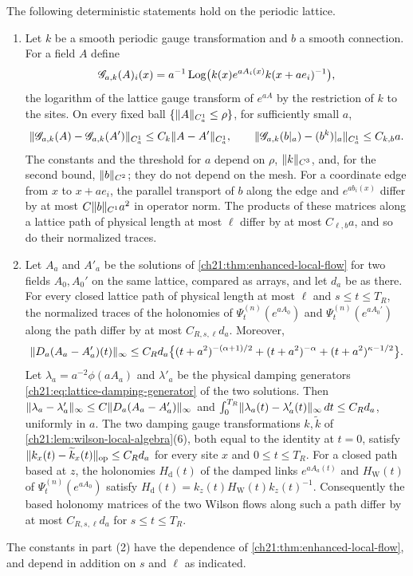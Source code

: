 \begin{lemma}\label{ch21:lem:local-matrix-gauge-and-loops}
The following deterministic statements hold on the periodic lattice.
\begin{enumerate}
\item Let $k$ be a smooth periodic gauge transformation and $b$ a smooth connection. For a field $A$ define
\[
 \mathscr G_{a,k}(A)_i(x)=a^{-1}\operatorname{Log}\bigl(k(x)e^{aA_i(x)}k(x+ae_i)^{-1}\bigr),
\]
the logarithm of the lattice gauge transform of $e^{aA}$ by the restriction of $k$ to the sites. On every fixed ball $\{\lVert A\rVert_{C_a^1}\le\rho\}$, for sufficiently small $a$,
\[
 \lVert \mathscr G_{a,k}(A)-\mathscr G_{a,k}(A')\rVert_{C_a^1}\le C_k\lVert A-A'\rVert_{C_a^1},\qquad
 \lVert \mathscr G_{a,k}(b|_a)-(b^k)|_a\rVert_{C_a^1}\le C_{k,b}a .
\]
The constants and the threshold for $a$ depend on $\rho$, $\lVert k\rVert_{C^3}$, and, for the second bound, $\lVert b\rVert_{C^2}$; they do not depend on the mesh. For a coordinate edge from $x$ to $x+ae_i$, the parallel transport of $b$ along the edge and $e^{ab_i(x)}$ differ by at most $C\lVert b\rVert_{C^1}a^2$ in operator norm. The products of these matrices along a lattice path of physical length at most $\ell$ differ by at most $C_{\ell,b}a$, and so do their normalized traces.
\item Let $A_a$ and $A'_a$ be the solutions of \cref{ch21:thm:enhanced-local-flow} for two fields $A_0,A_0'$ on the same lattice, compared as arrays, and let $d_a$ be as there. For every closed lattice path of physical length at most $\ell$ and $s\le t\le T_R$, the normalized traces of the holonomies of $\Psi^{(n)}_t(e^{aA_0})$ and $\Psi^{(n)}_t(e^{aA_0'})$ along the path differ by at most $C_{R,s,\ell}d_a$. Moreover,
\[
 \lVert D_a(A_a-A'_a)(t)\rVert_\infty\le C_Rd_a\bigl\{(t+a^2)^{-(\alpha+1)/2}+(t+a^2)^{-\alpha}+(t+a^2)^{\kappa-1/2}\bigr\}.
\]
Let $\lambda_a=a^{-2}\phi(aA_a)$ and $\lambda'_a$ be the physical damping generators \eqref{ch21:eq:lattice-damping-generator} of the two solutions. Then $\lVert \lambda_a-\lambda'_a\rVert_\infty\le C\lVert D_a(A_a-A'_a)\rVert_\infty$ and $\int_0^{T_R}\lVert \lambda_a(t)-\lambda'_a(t)\rVert_\infty\,dt\le C_Rd_a$, uniformly in $a$. The two damping gauge transformations $k,\widetilde k$ of \cref{ch21:lem:wilson-local-algebra}(6), both equal to the identity at $t=0$, satisfy $\lVert k_x(t)-\widetilde k_x(t)\rVert_{\mathrm{op}}\le C_Rd_a$ for every site $x$ and $0\le t\le T_R$. For a closed path based at $z$, the holonomies $H_{\mathrm d}(t)$ of the damped links $e^{aA_a(t)}$ and $H_{\mathrm W}(t)$ of $\Psi^{(n)}_t(e^{aA_0})$ satisfy $H_{\mathrm d}(t)=k_z(t)H_{\mathrm W}(t)k_z(t)^{-1}$. Consequently the based holonomy matrices of the two Wilson flows along such a path differ by at most $C_{R,s,\ell}d_a$ for $s\le t\le T_R$.
\end{enumerate}
The constants in part (2) have the dependence of \cref{ch21:thm:enhanced-local-flow}, and depend in addition on $s$ and $\ell$ as indicated.
\end{lemma}

